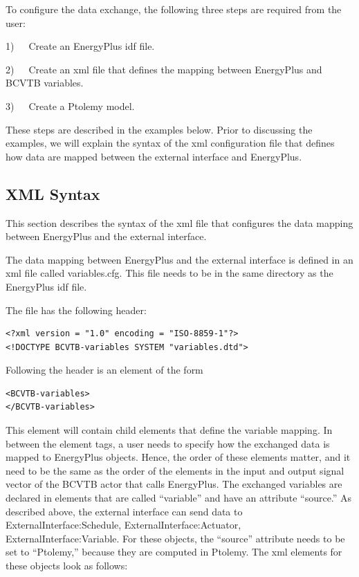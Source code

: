 To configure the data exchange, the following three steps are required from the user:

1)~~~Create an EnergyPlus idf file.

2)~~~Create an xml file that defines the mapping between EnergyPlus and BCVTB variables.

3)~~~Create a Ptolemy model.

These steps are described in the examples below. Prior to discussing the examples, we will explain the syntax of the xml configuration file that defines how data are mapped between the external interface and EnergyPlus.

\subsection{XML Syntax}\label{xml-syntax}

This section describes the syntax of the xml file that configures the data mapping between EnergyPlus and the external interface.

The data mapping between EnergyPlus and the external interface is defined in an xml file called variables.cfg. This file needs to be in the same directory as the EnergyPlus idf file.

The file has the following header:

\begin{lstlisting}
<?xml version = "1.0" encoding = "ISO-8859-1"?>
<!DOCTYPE BCVTB-variables SYSTEM "variables.dtd">
\end{lstlisting}

Following the header is an element of the form

\begin{lstlisting}
<BCVTB-variables>
</BCVTB-variables>
\end{lstlisting}

This element will contain child elements that define the variable mapping. In between the element tags, a user needs to specify how the exchanged data is mapped to EnergyPlus objects. Hence, the order of these elements matter, and it need to be the same as the order of the elements in the input and output signal vector of the BCVTB actor that calls EnergyPlus. The exchanged variables are declared in elements that are called ``variable'' and have an attribute ``source.'' As described above, the external interface can send data to ExternalInterface:Schedule, ExternalInterface:Actuator, ExternalInterface:Variable. For these objects, the ``source'' attribute needs to be set to ``Ptolemy,'' because they are computed in Ptolemy. The xml elements for these objects look as follows:


